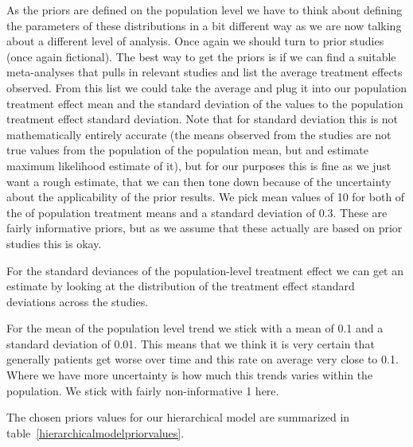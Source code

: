 \documentclass[12pt,a4paper,leqno]{report}
\theoremstyle{plain}
\theoremstyle{definition}
\theoremstyle{remark}
\begin{document}
As the priors are defined on the population level we have to think about defining the
parameters of these distributions in a bit different way as we are now talking about
a different level of analysis. Once again we should turn to prior studies (once again
fictional). The best way to get the priors is if we can find a suitable meta-analyses that
pulls in relevant studies and list the average treatment effects observed. From this list
we could take the average and plug it into our population treatment effect mean and the
standard deviation of the values to the population treatment effect standard deviation.
Note that for standard deviation this is not mathematically entirely accurate (the means
observed from the studies are not true values from the population of the population mean, but and estimate
maximum likelihood estimate of it), but for our purposes this is fine as we just want a
rough estimate, that we can then tone down because of the uncertainty about the
applicability of the prior results. We pick mean values of 10 for both of the of
population treatment means and a standard deviation of 0.3. These are fairly informative
priors, but as we assume that these actually are based on prior studies this is okay.

For the standard deviances of the population-level treatment effect we can get an
estimate by looking at the distribution of the treatment effect standard deviations
across the studies.


For the mean of the population level trend we stick with a mean of 0.1 and a standard
deviation of 0.01. This means that we think it is very certain that generally patients
get worse over time and this rate on average very close to 0.1. Where we have more
uncertainty is how much this trends varies within the population. We stick with fairly
non-informative 1 here.

The chosen priors values for our hierarchical
model are summarized in table\ \ref{hierarchicalmodelpriorvalues}.
\end{document}
